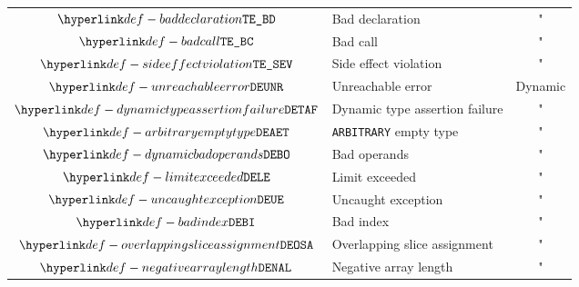 \begin{center}
\begin{tabular}{clc}
  $\BadDeclaration$              & Bad declaration                & "             \\
  $\BadCall$                     & Bad call                       & "             \\
  $\SideEffectViolation$         & Side effect violation          & "             \\
  \hline
  $\UnreachableError$            & Unreachable error              & Dynamic       \\
  $\DynamicTypeAssertionFailure$ & Dynamic type assertion failure & "             \\
  $\ArbitraryEmptyType$          & \texttt{ARBITRARY} empty type  & "             \\
  $\DynamicBadOperands$          & Bad operands                   & "             \\
  $\LimitExceeded$               & Limit exceeded                 & "             \\
  $\UncaughtException$           & Uncaught exception             & "             \\
  $\BadIndex$                    & Bad index                      & "             \\
  $\OverlappingSliceAssignment$  & Overlapping slice assignment   & "             \\
  $\NegativeArrayLength$         & Negative array length          & "             \\
\end{tabular}
\end{center}

